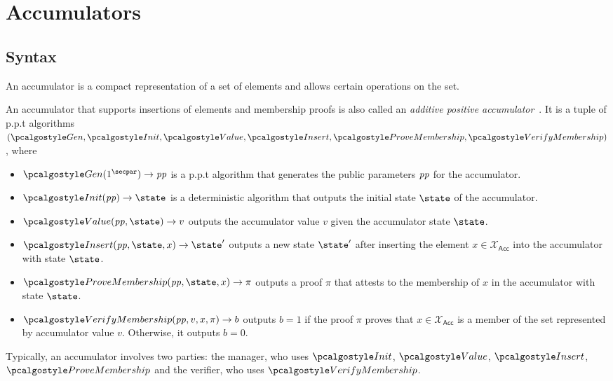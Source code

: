 \section{Accumulators}\label{sec:accumulators}

\subsection{Syntax}

An accumulator is a compact representation of a set of elements and allows certain operations on the set.

\begin{definition}[Accumulator]
An accumulator that supports insertions of elements and membership proofs is also called an \emph{additive positive accumulator}~\cite{RSA:BalCanYak20}.
It is a tuple of p.p.t algorithms $(\algo{Gen}, \algo{Init}, \algo{Value}, \algo{Insert}, \algo{ProveMembership}, \algo{VerifyMembership})$, where


\begin{itemize}
    \item $\algo{Gen}(1^\secpar)\rightarrow \params$ is a p.p.t algorithm that generates the public parameters $\mathit{pp}$ for the accumulator.
    \item $\algo{Init}(\params)\rightarrow \state$ is a deterministic algorithm that outputs the initial state $\state$ of the accumulator.
    \item $\algo{Value}(\params, \state)\rightarrow v$ outputs the accumulator value $v$ given the accumulator state $\state$.
    \item $\algo{Insert}(\params, \state, x) \rightarrow \state'$ outputs a new state $\state'$ after inserting the element $x \in \mathcal{X}_\mathsf{Acc}$ into the accumulator with state $\state$.
    \item $\algo{ProveMembership}(\params, \state, x) \rightarrow \pi$ outputs a proof $\pi$ that attests to the membership of $x$ in the accumulator with state $\state$.
    \item $\algo{VerifyMembership}(\params, v, x, \pi) \rightarrow b$ outputs $b = 1$ if the proof $\pi$ proves that $x \in \mathcal{X}_\mathsf{Acc}$ is a member of the set represented by accumulator value $v$. Otherwise, it outputs $b = 0$.
\end{itemize}
\end{definition}

Typically, an accumulator involves two parties: the manager, who uses $\algo{Init}$, $\algo{Value}$, $\algo{Insert}$, $\algo{ProveMembership}$ and the verifier, who uses $\algo{VerifyMembership}$.

